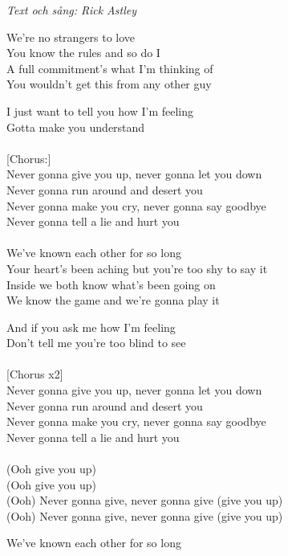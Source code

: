 {\footnotesize\textit{Text och sång: Rick Astley}}\par
\vspace{10pt}
We're no strangers to love\\
You know the rules and so do I\\
A full commitment's what I'm thinking of\\
You wouldn't get this from any other guy\par
\vspace{10pt}
I just want to tell you how I'm feeling\\
Gotta make you understand\\
\\
{[}Chorus:{]}\\
Never gonna give you up, never gonna let you down\\
Never gonna run around and desert you\\
Never gonna make you cry, never gonna say goodbye\\
Never gonna tell a lie and hurt you\\
\\
We've known each other for so long\\
Your heart's been aching but you're too shy to say it\\
Inside we both know what's been going on\\
We know the game and we're gonna play it\par
\vspace{10pt}
And if you ask me how I'm feeling \\
Don't tell me you're too blind to see\\
\\
{[}Chorus x2{]}\\
Never gonna give you up, never gonna let you down\\
Never gonna run around and desert you\\
Never gonna make you cry, never gonna say goodbye\\
Never gonna tell a lie and hurt you\\
\\
(Ooh give you up)\\
(Ooh give you up)\\
(Ooh) Never gonna give, never gonna give (give you up)\\
(Ooh) Never gonna give, never gonna give (give you up)\par
\vspace{10pt}
We've known each other for so long\\
